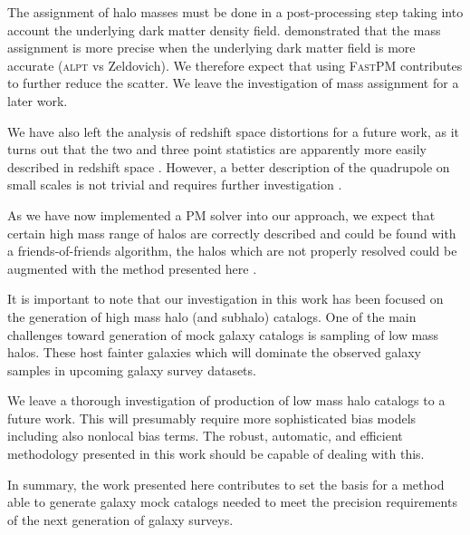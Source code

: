 The assignment of halo masses must be done in a post-processing step taking into account the underlying dark matter density field. \citet{zhao2015} demonstrated that the mass assignment is more precise when the underlying dark matter field is more accurate (\textsc{alpt} vs Zeldovich). We therefore expect that using \textsc{FastPM} contributes to further reduce the scatter. We leave the investigation of mass assignment for a later work.

We have also left the analysis of redshift space distortions for a future work, as it turns out that the two and three point statistics are apparently more easily described in redshift space \citep[see e.g.][]{kitaura2014,eazymock,chuang2015}. However, a better description of the quadrupole on  small scales is not trivial and requires further investigation \citep[see][]{chuang2015}.

As we have now implemented a PM solver into our approach, we expect that certain high mass range of halos are correctly described and could be found with a friends-of-friends algorithm, the halos which are not properly resolved could be augmented with the method presented here  \citep[see methods to extend the resolution of $N$-body simulations,][]{delatorre,angulo2014,ahn2015}.  

It is important to note that our investigation in this work has been focused on the generation of high mass halo (and subhalo) catalogs. One of the main challenges toward generation of mock galaxy catalogs is sampling of low mass halos. These host fainter galaxies which will dominate the observed galaxy samples in upcoming galaxy survey datasets. 

We leave a thorough investigation of production of low mass halo catalogs to a future work. This will presumably require more sophisticated bias models including also nonlocal bias terms. The robust, automatic, and efficient methodology presented in this work should be capable of dealing with this.


In summary, the work presented here contributes to set the basis for a method able to generate galaxy mock catalogs needed to meet the precision requirements of the next generation of galaxy surveys. 

%
%


